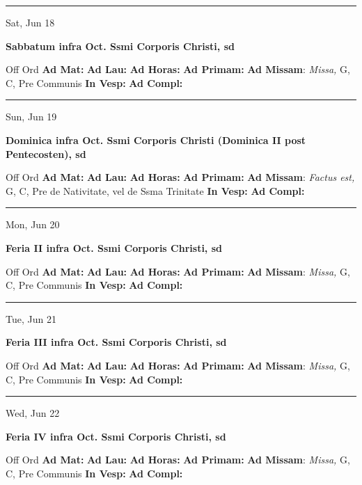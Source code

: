 \documentclass[letterpaper, 10pt]{article}
\begin{document}
\hrule
\begin{center}
Sat, Jun 18
\end{center}\textbf{ \large Sabbatum infra Oct. Ssmi Corporis Christi, \textnormal{\normalsize sd}}
\begin{justify}
Off Ord
\textbf{Ad Mat: }
\textbf{Ad Lau: }
\textbf{Ad Horas: }
\textbf{Ad Primam: }
\textbf{Ad Missam}: \textit{Missa,} G, C, Pre Communis
\textbf{In Vesp: }
\textbf{Ad Compl: }\end{justify}



\hrule
\begin{center}
Sun, Jun 19
\end{center}\textbf{ \large Dominica infra Oct. Ssmi Corporis Christi (Dominica II post Pentecosten), \textnormal{\normalsize sd}}
\begin{justify}
Off Ord
\textbf{Ad Mat: }
\textbf{Ad Lau: }
\textbf{Ad Horas: }
\textbf{Ad Primam: }
\textbf{Ad Missam}: \textit{Factus est,} G, C, Pre de Nativitate, vel de Ssma Trinitate
\textbf{In Vesp: }
\textbf{Ad Compl: }\end{justify}



\hrule
\begin{center}
Mon, Jun 20
\end{center}\textbf{ \large Feria II infra Oct. Ssmi Corporis Christi, \textnormal{\normalsize sd}}
\begin{justify}
Off Ord
\textbf{Ad Mat: }
\textbf{Ad Lau: }
\textbf{Ad Horas: }
\textbf{Ad Primam: }
\textbf{Ad Missam}: \textit{Missa,} G, C, Pre Communis
\textbf{In Vesp: }
\textbf{Ad Compl: }\end{justify}



\hrule
\begin{center}
Tue, Jun 21
\end{center}\textbf{ \large Feria III infra Oct. Ssmi Corporis Christi, \textnormal{\normalsize sd}}
\begin{justify}
Off Ord
\textbf{Ad Mat: }
\textbf{Ad Lau: }
\textbf{Ad Horas: }
\textbf{Ad Primam: }
\textbf{Ad Missam}: \textit{Missa,} G, C, Pre Communis
\textbf{In Vesp: }
\textbf{Ad Compl: }\end{justify}



\hrule
\begin{center}
Wed, Jun 22
\end{center}\textbf{ \large Feria IV infra Oct. Ssmi Corporis Christi, \textnormal{\normalsize sd}}
\begin{justify}
Off Ord
\textbf{Ad Mat: }
\textbf{Ad Lau: }
\textbf{Ad Horas: }
\textbf{Ad Primam: }
\textbf{Ad Missam}: \textit{Missa,} G, C, Pre Communis
\textbf{In Vesp: }
\textbf{Ad Compl: }\end{justify}
\end{document}
